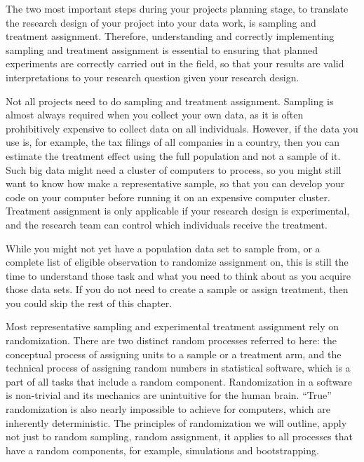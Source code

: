 The two most important steps during your projects planning stage,
to translate the research design of your project into your data work,
is sampling and treatment assignment.
Therefore, understanding and correctly implementing sampling and treatment assignment
is essential to ensuring that planned experiments
are correctly carried out in the field, so that your results
are valid interpretations to your research question given your research design.

Not all projects need to do sampling and treatment assignment. 
Sampling is almost always required when you collect your own data, 
as it is often prohibitively expensive to collect data on all individuals. 
However, if the data you use is, for example, the tax filings of all companies in a country,
then you can estimate the treatment effect using the full population and not a sample of it. 
Such big data might need a cluster of computers to process,
so you might still want to know how make a representative sample, 
so that you can develop your code on your computer before running it on an expensive computer cluster.
Treatment assignment is only applicable if your research design is experimental,
and the research team can control which individuals receive the treatment. 

While you might not yet have a population data set to sample from, 
or a complete list of eligible observation to randomize assignment on, 
this is still the time to understand those task 
and what you need to think about as you acquire those data sets.
If you do not need to create a sample or assign treatment, 
then you could skip the rest of this chapter.


Most representative sampling and experimental treatment assignment rely on randomization.
There are two distinct random processes referred to here:
the conceptual process of assigning units to a sample or a treatment arm,
and the technical process of assigning random numbers in statistical software,
which is a part of all tasks that include a random component.
Randomization in a software is non-trivial and its mechanics are unintuitive for the human brain.
``True'' randomization is also nearly impossible to achieve for computers,
which are inherently deterministic.
The principles of randomization we will outline, apply not just to random sampling, random assignment, 
it applies to all processes that have a random components, for example, simulations and bootstrapping.



